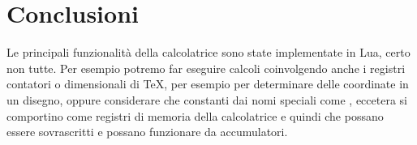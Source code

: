\section{Conclusioni}

Le principali funzionalità della calcolatrice sono state implementate in Lua,
certo non tutte. Per esempio potremo far eseguire calcoli coinvolgendo anche i
registri contatori o dimensionali di \TeX{}, per esempio per determinare delle
coordinate in un disegno, oppure considerare che constanti dai nomi speciali
come ,  eccetera si comportino come registri di memoria della
calcolatrice e quindi che possano essere sovrascritti e possano funzionare da
accumulatori.

